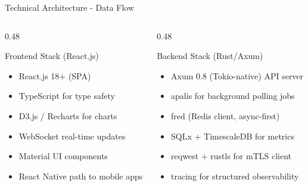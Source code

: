 \begin{frame}{Technical Architecture - Data Flow}
  \begin{columns}[T]
    \begin{column}{0.48\textwidth}
      \begin{block}{Frontend Stack (React.js)}
        \scriptsize
        \begin{itemize}
          \setlength{\itemsep}{0pt}
          \item React.js 18+ (SPA)
          \item TypeScript for type safety
          \item D3.js / Recharts for charts
          \item WebSocket real-time updates
          \item Material UI components
          \item React Native path to mobile apps
        \end{itemize}
      \end{block}
    \end{column}
    \begin{column}{0.48\textwidth}
      \begin{block}{Backend Stack (Rust/Axum)}
        \scriptsize
        \begin{itemize}
          \setlength{\itemsep}{0pt}
          \item Axum 0.8 (Tokio-native) API server
          \item apalis for background polling jobs
          \item fred (Redis client, async-first)
          \item SQLx + TimescaleDB for metrics
          \item reqwest + rustls for mTLS client
          \item tracing for structured observability
        \end{itemize}
      \end{block}
    \end{column}
  \end{columns}
\end{frame}

